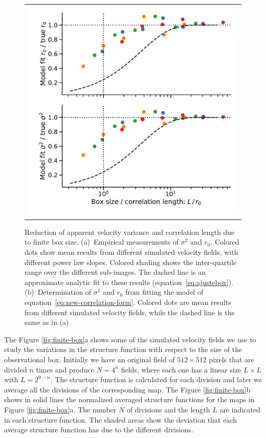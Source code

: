 \documentclass[fleqn,usenatbib, useAMS, a4paper]{mnras}
\begin{document}
\begin{figure}
\begin{tabular}{@{} l @{}}
    \includegraphics[width=0.95\linewidth]{Figures/fake-finite-box-fits}
  \end{tabular}
  \caption{
    Reduction of apparent velocity variance and correlation length
    due to finite box size.
    (a)~Empirical measurements of \(\sigma^2\) and \(r_0\).
    Colored dots show mean results from different simulated velocity fields,
    with different power law slopes.
    Colored shading shows the inter-quartile range over the different sub-images.
    The dashed line is an approximate analytic fit to these results
    (equation~\eqref{eq:ajustebox}).
    (b)~Determination of \(\sigma^2\) and \(r_0\) from fitting the model
    of equation~\eqref{eq:new-correlation-form}.
    Colored dots are mean results from different simulated velocity fields,
    while the dashed line is the same as in (a).
  }
  \label{fig:finite-box-effect}
\end{figure}

The Figure \ref{fig:finite-box}a shows some of the simulated velocity fields we use to study the variations in the structure function with respect to the size of the observational box.
Initially we have an original field of \(512 \times 512 \) pixels that are divided \(n\) times and produce \(N = 4^n\) fields, where each one has a linear size \(L \times L \) with \(L = 2^{9 -n}\).
The structure function is calculated for each division and later we average all the divisions of the corresponding map. 
The Figure \ref{fig:finite-box}b shows in solid lines the normalized averaged structure functions for the maps in Figure \ref{fig:finite-box}a.
The number \(N\) of divisions and the length \(L\) are indicated in each structure function.
The shaded areas show the deviation that each average structure function has due to the different divisions. 
\end{document}
